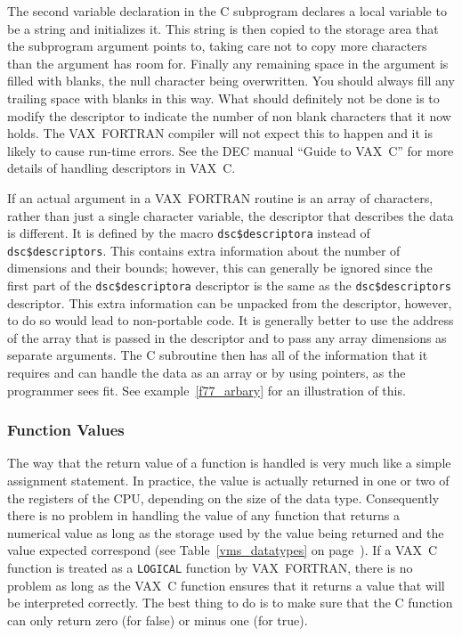 \documentclass[twoside,11pt]{article}
\newcommand{\latex}[1]{#1}
\renewcommand{\_}{\texttt{\symbol{95}}}
\begin{document}
The second variable declaration in the C subprogram declares a local variable
to be a string and initializes it. This string is then copied to the storage
area that the subprogram argument points to, taking care not to copy more
characters than the argument has room for. Finally any remaining space in the
argument is filled with blanks, the null character being overwritten. You
should always fill any trailing space with blanks in this way. What should
definitely not be done is to modify the descriptor to indicate the number of
non blank characters that it now holds. The VAX~FORTRAN compiler will not
expect this to happen and it is likely to cause run-time errors. See the DEC
manual ``Guide to VAX~C'' for more details of handling descriptors in VAX~C\@.

If an actual argument in a VAX~FORTRAN routine is an array of characters, rather
than just a single character variable, the descriptor that describes the data
is different. It is defined by the macro \texttt{dsc\$descriptor\_a} instead of
\texttt{dsc\$descriptor\_s}. This contains extra information about the number of
dimensions and their bounds; however, this can generally be ignored since the
first part of the \texttt{dsc\$descriptor\_a} descriptor is the same as the 
\texttt{dsc\$descriptor\_s} descriptor. This extra information can be unpacked from the
descriptor, however, to do so would lead to non-portable code. It is generally
better to use the address of the array that is passed in the descriptor and to
pass any array dimensions as separate arguments. The C subroutine then has all
of the information that it requires and can handle the data as an array or by
using pointers, as the programmer sees fit. See example~\ref{f77_arbary} for
an illustration of this.

\subsubsection{Function Values}

The way that the return value of a function is handled is very much like a
simple assignment statement. In practice, the value is actually returned in one
or two of the registers of the CPU, depending on the size of the data type.
Consequently there is no problem in handling the value of any function that
returns a numerical value as long as the storage used by the value being
returned and the value expected correspond 
(see Table~\ref{vms_datatypes}\latex{ on page~\pageref{vms_datatypes}}).
If a VAX~C function is treated as a \texttt{LOGICAL} function by VAX~FORTRAN, 
there is no problem as long as the VAX~C function ensures that it returns a 
value that will be interpreted correctly.
The best thing to do is to make sure that the C function can only return zero 
(for false) or minus one (for true).
\end{document}
